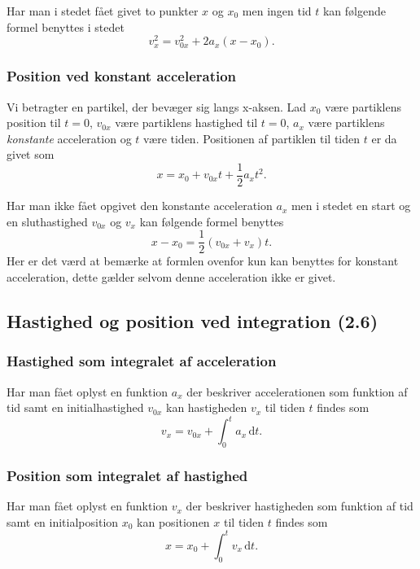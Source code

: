 Har man i stedet fået givet to punkter $x$ og $x_0$ men ingen tid $t$ kan følgende formel benyttes i stedet
\[ 
v_x^2 = v_{0x}^2 + 2a_x(x-x_0)
.\]


\subsubsection{Position ved konstant acceleration} \label{afs:posconacc}
Vi betragter en partikel, der bevæger sig langs x-aksen. Lad $x_0$ være partiklens position til $t = 0$, $v_{0x}$ være partiklens hastighed til $t = 0$, $a_x$ være partiklens \textit{konstante} acceleration og $t$ være tiden. Positionen af partiklen til tiden $t$ er da givet som
\[ 
x = x_0 + v_{0x}t + \frac{1}{2}a_xt^2
.\]

Har man ikke fået opgivet den konstante acceleration $a_x$ men i stedet en start og en sluthastighed $v_{0x}$ og $v_x$ kan følgende formel benyttes
\[ 
x-x_0 = \frac{1}{2}(v_{0x} + v_x)t
.\]
Her er det værd at bemærke at formlen ovenfor kun kan benyttes for konstant acceleration, dette gælder selvom denne acceleration ikke er givet.


\subsection{Hastighed og position ved integration (2.6)}

\subsubsection{Hastighed som integralet af acceleration} \label{afs:hasacc}
Har man fået oplyst en funktion $a_x$ der beskriver accelerationen som funktion af tid samt en initialhastighed $v_{0x}$ kan hastigheden $v_x$ til tiden $t$ findes som
\[ 
v_x = v_{0x} + \int_{0}^{t} a_x \, \mathrm{d}t 
.\]


\subsubsection{Position som integralet af hastighed} \label{afs:poshas}
Har man fået oplyst en funktion $v_x$ der beskriver hastigheden som funktion af tid samt en initialposition $x_{0}$ kan positionen $x$ til tiden $t$ findes som
\[ 
x = x_0 + \int_{0}^{t} v_x \, \mathrm{d}t 
.\]

